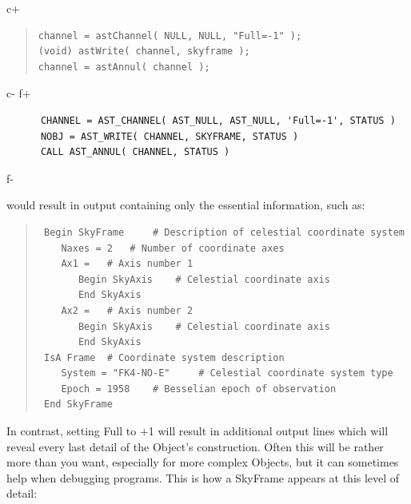 \documentclass[twoside,11pt]{article}
\begin{document}
c+
\begin{quote}
\small
\begin{verbatim}
channel = astChannel( NULL, NULL, "Full=-1" );
(void) astWrite( channel, skyframe );
channel = astAnnul( channel );
\end{verbatim}
\normalsize
\end{quote}
c-
f+
\small
\begin{verbatim}
      CHANNEL = AST_CHANNEL( AST_NULL, AST_NULL, 'Full=-1', STATUS )
      NOBJ = AST_WRITE( CHANNEL, SKYFRAME, STATUS )
      CALL AST_ANNUL( CHANNEL, STATUS )
\end{verbatim}
\normalsize
f-

would result in output containing only the essential information, such
as:

\begin{quote}
\small
\begin{verbatim}
 Begin SkyFrame 	# Description of celestial coordinate system
    Naxes = 2 	# Number of coordinate axes
    Ax1 = 	# Axis number 1
       Begin SkyAxis 	# Celestial coordinate axis
       End SkyAxis
    Ax2 = 	# Axis number 2
       Begin SkyAxis 	# Celestial coordinate axis
       End SkyAxis
 IsA Frame 	# Coordinate system description
    System = "FK4-NO-E" 	# Celestial coordinate system type
    Epoch = 1958 	# Besselian epoch of observation
 End SkyFrame
\end{verbatim}
\normalsize
\end{quote}

In contrast, setting Full to $+$1 will result in additional output
lines which will reveal every last detail of the Object's
construction. Often this will be rather more than you want, especially
for more complex Objects, but it can sometimes help when debugging
programs. This is how a SkyFrame appears at this level of detail:
\end{document}
